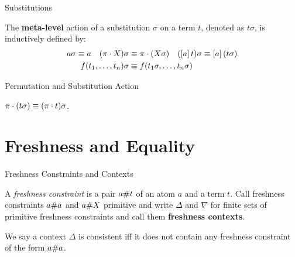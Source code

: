 \documentclass{beamer}
\begin{document}
    \begin{frame}{Substitutions}
        \begin{definition}\label{definition:substitution-meta-level}
            The \textbf{meta-level} action of a substitution $\sigma$ on a term $t$, denoted as $t\sigma$, is inductively defined by:
            \begin{align*}
                a\sigma \equiv a \quad (\pi \cdot X)\sigma & \equiv \pi \cdot (X\sigma) \quad (\left[ a \right]t)\sigma \equiv \left[ a \right](t\sigma) \\
                f(t_1,\dots,t_n)\sigma                          & \equiv f(t_1 \sigma, \dots, t_n \sigma)
            \end{align*}
        \end{definition}
    \end{frame}


    \begin{frame}{Permutation and Substitution Action}
        \begin{lemma}\label{lemma:commutation-lemma}
            $\pi \cdot (t \sigma) \equiv (\pi \cdot t)\sigma$.
        \end{lemma}
    \end{frame}

    \section{Freshness and Equality}

    \begin{frame}{Freshness Constraints and Contexts}
        \begin{definition}[Contexts]
            A \textit{freshness constraint} is a pair $a \# t$ of an atom $a$ and a term $t$. Call freshness constraints $a \# a$ and $a \# X$ primitive and write $\Delta$ and $\nabla$ for finite sets of primitive freshness constraints and call them \textbf{freshness contexts}.

            We say a context $\Delta$ is consistent iff it does not contain any freshness constraint of the form $a \# a$.
        \end{definition}
    \end{frame}
\end{document}
